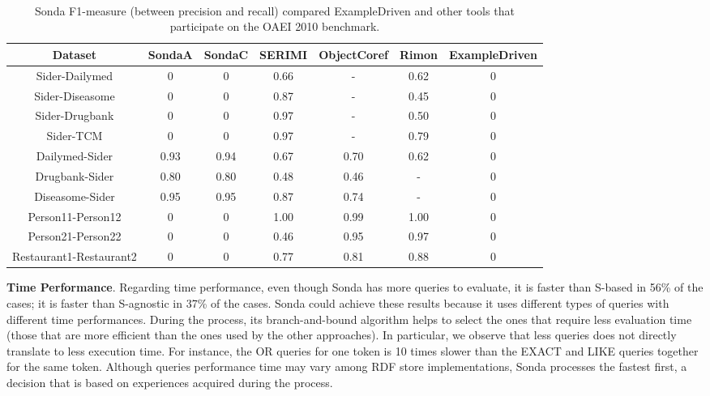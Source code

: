 \begin{center}
\begin{table*}
\centering
\scriptsize\tt
\caption{Sonda  F1-measure (between precision and recall) compared ExampleDriven and  other tools that participate on the OAEI 2010 benchmark.} 
\begin{tabular}{|c|c|c|c|c|c|c|}
\hline
Dataset &  SondaA &  SondaC & SERIMI & ObjectCoref & Rimon & ExampleDriven \\ \hline
Sider-Dailymed & 0 & 0   & 0.66 & - & 0.62  & 0\\ \hline
Sider-Diseasome & 0& 0   & 0.87 & - & 0.45 & 0\\ \hline
Sider-Drugbank & 0 & 0  & 0.97 & - & 0.50  & 0\\ \hline
Sider-TCM & 0 & 0  & 0.97 & - & 0.79 &  0\\ \hline
Dailymed-Sider & 0.93  & 0.94 & 0.67 & 0.70 & 0.62  & 0\\ \hline
Drugbank-Sider & 0.80  & 0.80 & 0.48 & 0.46 & -  & 0\\ \hline
Diseasome-Sider & 0.95 & 0.95   & 0.87 & 0.74 & -  & 0\\ \hline
Person11-Person12 & 0 & 0  & 1.00 & 0.99 & 1.00  & 0\\ \hline
Person21-Person22 & 0 & 0  & 0.46 & 0.95 & 0.97 & 0\\ \hline
Restaurant1-Restaurant2 & 0 & 0  & 0.77 & 0.81  & 0.88 & 0\\ \hline
 								 									 
\end{tabular}  
\end{table*} 
\end{center}


\textbf{Time Performance}. Regarding time performance, even though Sonda has more queries to evaluate, it is faster than S-based in 56\% of the cases; it is faster than S-agnostic in 37\% of the cases. Sonda could achieve these results because it uses different types of queries with different time performances. During the process, its branch-and-bound algorithm helps to select the ones that require less evaluation time (those that are more efficient than the ones used by the other approaches). In particular, we observe that less queries does not directly translate to less execution time. For instance, the OR queries for one token is 10 times slower than the EXACT and LIKE queries together for the same token. Although queries performance time may vary among RDF store implementations, Sonda processes the fastest first, a decision that is based on experiences acquired during the process. 

